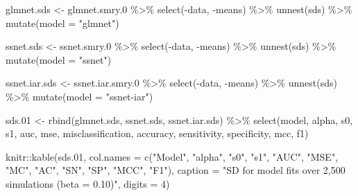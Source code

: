 \documentclass[
]{article}
\newenvironment{Shaded}{\begin{snugshade}}{\end{snugshade}}
\newcommand{\AttributeTok}[1]{\textcolor[rgb]{0.77,0.63,0.00}{#1}}
\newcommand{\DecValTok}[1]{\textcolor[rgb]{0.00,0.00,0.81}{#1}}
\newcommand{\FloatTok}[1]{\textcolor[rgb]{0.00,0.00,0.81}{#1}}
\newcommand{\FunctionTok}[1]{\textcolor[rgb]{0.00,0.00,0.00}{#1}}
\newcommand{\NormalTok}[1]{#1}
\newcommand{\OtherTok}[1]{\textcolor[rgb]{0.56,0.35,0.01}{#1}}
\newcommand{\SpecialCharTok}[1]{\textcolor[rgb]{0.00,0.00,0.00}{#1}}
\newcommand{\StringTok}[1]{\textcolor[rgb]{0.31,0.60,0.02}{#1}}
\begin{document}
\begin{Shaded}
\begin{Highlighting}[]
\NormalTok{glmnet.sds }\OtherTok{\textless{}{-}}\NormalTok{ glmnet.smry}\FloatTok{.0} \SpecialCharTok{\%\textgreater{}\%}
  \FunctionTok{select}\NormalTok{(}\SpecialCharTok{{-}}\NormalTok{data, }\SpecialCharTok{{-}}\NormalTok{means) }\SpecialCharTok{\%\textgreater{}\%}
  \FunctionTok{unnest}\NormalTok{(sds) }\SpecialCharTok{\%\textgreater{}\%} 
  \FunctionTok{mutate}\NormalTok{(}\AttributeTok{model =} \StringTok{"glmnet"}\NormalTok{)}

\NormalTok{ssnet.sds }\OtherTok{\textless{}{-}}\NormalTok{ ssnet.smry}\FloatTok{.0} \SpecialCharTok{\%\textgreater{}\%}
  \FunctionTok{select}\NormalTok{(}\SpecialCharTok{{-}}\NormalTok{data, }\SpecialCharTok{{-}}\NormalTok{means) }\SpecialCharTok{\%\textgreater{}\%}
  \FunctionTok{unnest}\NormalTok{(sds) }\SpecialCharTok{\%\textgreater{}\%}
  \FunctionTok{mutate}\NormalTok{(}\AttributeTok{model =} \StringTok{"ssnet"}\NormalTok{)}

\NormalTok{ssnet.iar.sds }\OtherTok{\textless{}{-}}\NormalTok{ ssnet.iar.smry}\FloatTok{.0} \SpecialCharTok{\%\textgreater{}\%}
  \FunctionTok{select}\NormalTok{(}\SpecialCharTok{{-}}\NormalTok{data, }\SpecialCharTok{{-}}\NormalTok{means) }\SpecialCharTok{\%\textgreater{}\%}
  \FunctionTok{unnest}\NormalTok{(sds) }\SpecialCharTok{\%\textgreater{}\%}
  \FunctionTok{mutate}\NormalTok{(}\AttributeTok{model =} \StringTok{"ssnet{-}iar"}\NormalTok{)}

\NormalTok{sds}\FloatTok{.01} \OtherTok{\textless{}{-}} \FunctionTok{rbind}\NormalTok{(glmnet.sds,}
\NormalTok{                ssnet.sds,}
\NormalTok{                ssnet.iar.sds) }\SpecialCharTok{\%\textgreater{}\%}
  \FunctionTok{select}\NormalTok{(model, alpha, s0, s1, auc, mse, misclassification, accuracy, sensitivity, specificity, mcc, f1)}

\NormalTok{knitr}\SpecialCharTok{::}\FunctionTok{kable}\NormalTok{(sds}\FloatTok{.01}\NormalTok{,}
             \AttributeTok{col.names =} \FunctionTok{c}\NormalTok{(}\StringTok{"Model"}\NormalTok{, }\StringTok{"alpha"}\NormalTok{, }\StringTok{"s0"}\NormalTok{, }\StringTok{"s1"}\NormalTok{,}
                           \StringTok{"AUC"}\NormalTok{, }\StringTok{"MSE"}\NormalTok{, }\StringTok{"MC"}\NormalTok{, }\StringTok{"AC"}\NormalTok{, }\StringTok{"SN"}\NormalTok{, }\StringTok{"SP"}\NormalTok{, }\StringTok{"MCC"}\NormalTok{, }\StringTok{"F1"}\NormalTok{),}
             \AttributeTok{caption =} \StringTok{"SD for model fits over 2,500 simulations (beta = 0.10)"}\NormalTok{,}
             \AttributeTok{digits =} \DecValTok{4}\NormalTok{)}
\end{Highlighting}
\end{Shaded}
\end{document}
